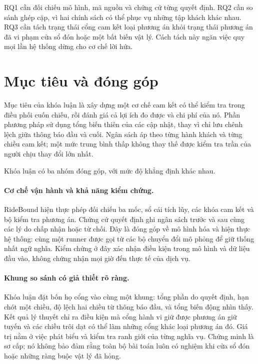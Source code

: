 RQ1 cần đối chiếu mô hình, mã nguồn và chứng cứ từng quyết định. RQ2 cần so sánh ghép cặp,
vì hai chính sách có thể phục vụ những tập khách khác nhau. RQ3 cần tách trạng thái cổng
cam kết loại phương án khỏi trạng thái phương án đã vi phạm cửa sổ đón hoặc một bất biến
vật lý. Cách tách này ngăn việc quy mọi lần hệ thống dừng cho cơ chế lời hứa.

\section{Mục tiêu và đóng góp}

Mục tiêu của khóa luận là xây dựng một cơ chế cam kết có thể kiểm tra trong điều phối cuốn
chiếu, rồi đánh giá cả lợi ích đo được và chi phí của nó. Phần phương pháp sử dụng tổng biến
thiên của các cập nhật, thay vì chỉ lưu chênh lệch giữa thông báo đầu và cuối. Ngân sách áp
theo từng hành khách và từng chiều cam kết; một mức trung bình thấp không thay thế được
kiểm tra trần của người chịu thay đổi lớn nhất.

Khóa luận có ba nhóm đóng góp, với mức độ khẳng định khác nhau.

\paragraph{Cơ chế vận hành và khả năng kiểm chứng.}
RideBound hiện thực phép đối chiếu ba mốc, sổ cái tích lũy, các khóa cam kết và bộ kiểm tra
phương án. Chứng cứ quyết định ghi ngân sách trước và sau cùng các lý do chấp nhận hoặc
từ chối. Đây là đóng góp về mô hình hóa và hiện thực hệ thống: cùng một runner được gọi từ
các bộ chuyển đổi mô phỏng để giữ thống nhất ngữ nghĩa. Kiểm chứng ở đây xác nhận điều kiện
trong mô hình và dữ liệu đầu vào, không chứng nhận mọi giờ đến thực tế của dịch vụ.

\paragraph{Khung so sánh có giả thiết rõ ràng.}
Khóa luận đặt bốn họ cổng vào cùng một khung: tổng phần do quyết định, hạn chót một chiều,
độ lệch hai chiều từ thông báo đầu, và tổng biến động nhìn thấy. Kết quả lý thuyết chỉ ra
điều kiện mà cổng hành vi giữ được phương án giữ tuyến và các chiều trôi dạt có thể làm
những cổng khác loại phương án đó. Giá trị nằm ở việc phát biểu và kiểm tra ranh giới của
từng nghĩa vụ. Chứng minh là sơ cấp; nó không bảo đảm rằng toàn bộ bài toán luôn có nghiệm
khi cửa sổ đón hoặc những ràng buộc vật lý đã hỏng.

